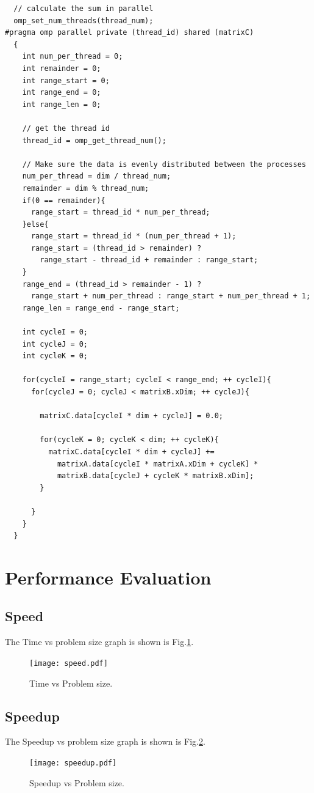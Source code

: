 \documentclass[12pt]{article}
\begin{document}
\small
\begin{verbatim}
  // calculate the sum in parallel
  omp_set_num_threads(thread_num);
#pragma omp parallel private (thread_id) shared (matrixC)
  {
    int num_per_thread = 0;
    int remainder = 0;
    int range_start = 0;
    int range_end = 0;
    int range_len = 0;

    // get the thread id
    thread_id = omp_get_thread_num();
    
    // Make sure the data is evenly distributed between the processes
    num_per_thread = dim / thread_num;
    remainder = dim % thread_num;
    if(0 == remainder){
      range_start = thread_id * num_per_thread;
    }else{
      range_start = thread_id * (num_per_thread + 1);
      range_start = (thread_id > remainder) ? 
        range_start - thread_id + remainder : range_start;
    }
    range_end = (thread_id > remainder - 1) ? 
      range_start + num_per_thread : range_start + num_per_thread + 1;
    range_len = range_end - range_start;

    int cycleI = 0;
    int cycleJ = 0;
    int cycleK = 0;

    for(cycleI = range_start; cycleI < range_end; ++ cycleI){
      for(cycleJ = 0; cycleJ < matrixB.xDim; ++ cycleJ){

        matrixC.data[cycleI * dim + cycleJ] = 0.0;

        for(cycleK = 0; cycleK < dim; ++ cycleK){
          matrixC.data[cycleI * dim + cycleJ] += 
            matrixA.data[cycleI * matrixA.xDim + cycleK] *
            matrixB.data[cycleJ + cycleK * matrixB.xDim];
        }

      }
    }
  }
\end{verbatim}
\normalsize
\section{Performance Evaluation}
\subsection{Speed}
The Time vs problem size graph is shown is Fig.\ref{fig:speed}.
\begin{figure}[h!]
	\begin{center}
		\texttt{[image: speed.pdf]}
		\caption{\label{fig:speed}Time vs Problem size.}
	\end{center}
\end{figure}

\subsection{Speedup}
The Speedup vs problem size graph is shown is Fig.\ref{fig:speedup}.
\begin{figure}[h!]
	\begin{center}
		\texttt{[image: speedup.pdf]}
		\caption{\label{fig:speedup}Speedup vs Problem size.}
	\end{center}
\end{figure}
\end{document}
